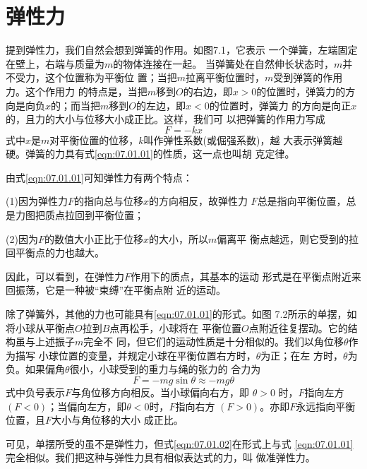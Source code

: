 \section{弹性力}\label{sec:07.01}

提到弹性力，我们自然会想到弹簧的作用。如图7.1，它表示
一个弹簧，左端固定在壁上，右端与质量为$ m $的物体连接在一起。
当弹簧处在自然伸长状态时，$ m $并不受力，这个位置称为平衡位
置；当把$ m $拉离平衡位置时，$ m $受到弹簧的作用力。这个作用力
的特点是，当把$ m $移到$ O $的右边，即$  x > 0   $的位置时，弹簧力的方
向是向负$ x $的；而当把$ m $移到$ O $的左边，即$ x<0 $的位置时，弹簧力
的方向是向正$ x $的，且力的大小与位移大小成正比。这样，我们可
以把弹簧的作用力写成
\begin{equation}\label{eqn:07.01.01}
	F = - k x
\end{equation}
式中$ x $是$ m $对平衡位置的位移，$ k $叫作弹性系数(或倔强系数)，越
大表示弹簧越硬。弹簧的力具有式\eqref{eqn:07.01.01}的性质，这一点也叫胡
克定律。

由式\eqref{eqn:07.01.01}可知弹性力有两个特点：

(1)因为弹性力$ F $的指向总与位移$ x $的方向相反，故弹性力
$ F $总是指向平衡位置，总是力图把质点拉回到平衡位置；

(2)因为$ F $的数值大小正比于位移$ x $的大小，所以$ m $偏离平
衡点越远，则它受到的拉回平衡点的力也越大。

因此，可以看到，在弹性力$ F $作用下的质点，其基本的运动
形式是在平衡点附近来回振荡，它是一种被“束缚”在平衡点附
近的运动。

除了弹簧外，其他的力也可能具有\eqref{eqn:07.01.01}的形式。如图
7.2所示的单摆，如将小球从平衡点$ O $拉到$ B $点再松手，小球将在
平衡位置$ O $点附近往复摆动。它的结构虽与上述振子$ m $完全不
同，但它们的运动性质是十分相似的。我们以角位移$ \theta $作为描写
小球位置的变量，并规定小球在平衡位置右方时，$ \theta $为正；在左
方时，$ \theta $为负。如果偏角$ \theta $很小，小球受到的重力与绳的张力的
合力为
\begin{equation}\label{eqn:07.01.02}
	F = - m g \sin \theta \approx - m g \theta
\end{equation}
式中负号表示$ F $与角位移方向相反。当小球偏向右方，即 $ \theta > 0  $
时，$ F $指向左方$ \left( F < 0 \right) $；当偏向左方，即$  \theta < 0   $时，$ F $指向右方
$ \left( F > 0 \right) $。亦即$ F $永远指向平衡位置，且$ F $大小与角位移的大小
成正比。

可见，单摆所受的虽不是弹性力，但式\eqref{eqn:07.01.02}在形式上与式
\eqref{eqn:07.01.01}完全相似。我们把这种与弹性力具有相似表达式的力，叫
做准弹性力。

